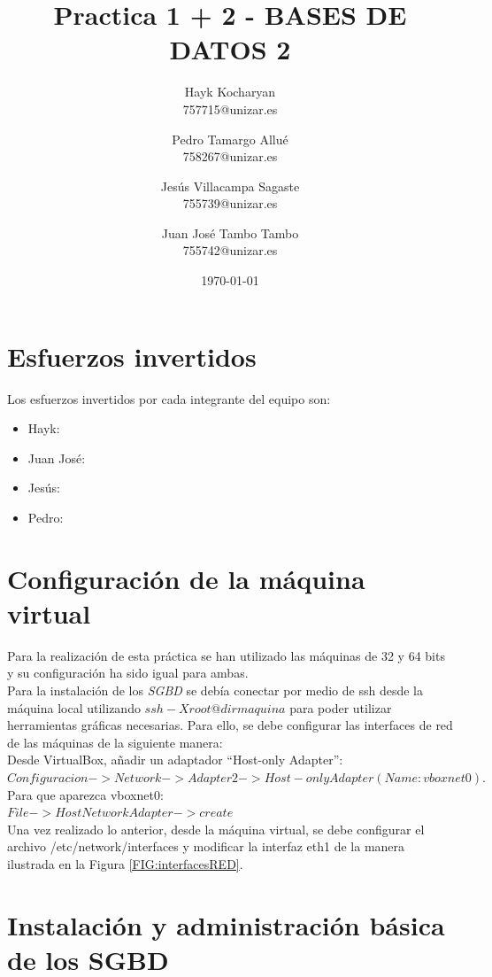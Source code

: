 \documentclass{article}
\title{\Huge Practica 1 + 2 - BASES DE DATOS 2}
\author{
  Hayk Kocharyan\\
  757715@unizar.es
  \and
  Pedro Tamargo Allué\\
  758267@unizar.es
  \and
  Jesús Villacampa Sagaste\\
  755739@unizar.es
  \and
  Juan José Tambo Tambo\\
  755742@unizar.es
}
\date{\today}
\begin{document}
\maketitle

%
\tableofcontents

\newpage 

\section{Esfuerzos invertidos}
Los esfuerzos invertidos por cada integrante del equipo son:
\begin{itemize}
\item Hayk:
\item Juan José:
\item Jesús:
\item Pedro: 
\end{itemize}

\section{Configuración de la máquina virtual}
Para la realización de esta práctica se han utilizado las máquinas de 32 y 64 bits y su configuración ha sido igual para ambas.\\

Para la instalación de los \emph{SGBD} se debía conectar por medio de ssh  desde la máquina local utilizando $ssh -X root@dirmaquina$ para poder utilizar herramientas gráficas necesarias. Para ello, se debe configurar las interfaces de red de las máquinas de la siguiente manera:\\
Desde VirtualBox, añadir un adaptador “Host-only Adapter”:\\
$Configuracion->Network->Adapter2->Host-only Adapter (Name: vboxnet0).$
\\
Para que aparezca vboxnet0:\\
$File->Host Network Adapter->create$
\\
Una vez realizado lo anterior, desde la máquina virtual, se debe configurar el archivo /etc/network/interfaces y modificar la interfaz eth1 de la manera ilustrada en la Figura \ref{FIG:interfacesRED}.


\section{Instalación y administración básica de los SGBD}
\end{document}
